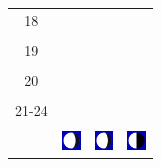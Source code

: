 \documentclass[twoside, a4paper,12pt, tikz]{scrartcl}
\begin{document}
\begin{tabularx}{\linewidth}{|c|X|X|X|}
        &   &       &    \\
      \hline
      18&   &       &    \\
        &   &       &    \\
      \hline
      19&   &       &    \\
        &   &       &    \\
      \hline
      20&   &       &    \\
        &   &       &    \\
      \hline
      21-24&   &       &    \\
        &   &       &    \\
      \hline  
      & \vspace{0.01cm} \centerline{\includegraphics[width=0.5cm]{moon_phases/Moon_phase_5.svg.png}} \vspace{0.1cm} & \vspace{0.01cm} \centerline{\includegraphics[width=0.5cm]{moon_phases/Moon_phase_5.svg.png}} \vspace{0.1cm} & \vspace{0.01cm} \centerline{\includegraphics[width=0.5cm]{moon_phases/Moon_phase_6.svg.png}} \vspace{0.1cm}\\
      \hline   
    \end{tabularx}




    \newpage

        \noindent
\end{document}
